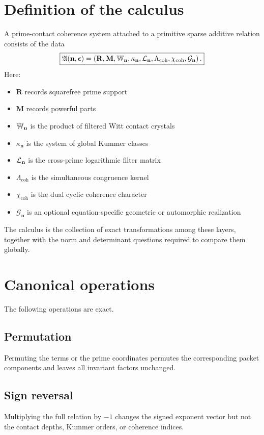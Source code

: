 \section{Definition of the calculus}
A prime-contact coherence system attached to a primitive sparse additive relation consists of the data
\[
\boxed{
\mathfrak A(\mathbf n,\boldsymbol\epsilon)
=
\left(
\mathbf R,
\mathbf M,
\mathbb W_{\mathbf n},
\kappa_{\mathbf n},
\mathcal L_{\mathbf n},
\Lambda_{\mathrm{coh}},
\chi_{\mathrm{coh}},
\mathcal G_{\mathbf n}
\right).
}
\]
Here:
\begin{itemize}[leftmargin=1.5em]
\item $\mathbf R$ records squarefree prime support
\item $\mathbf M$ records powerful parts
\item $\mathbb W_{\mathbf n}$ is the product of filtered Witt contact crystals
\item $\kappa_{\mathbf n}$ is the system of global Kummer classes
\item $\mathcal L_{\mathbf n}$ is the cross-prime logarithmic filter matrix
\item $\Lambda_{\mathrm{coh}}$ is the simultaneous congruence kernel
\item $\chi_{\mathrm{coh}}$ is the dual cyclic coherence character
\item $\mathcal G_{\mathbf n}$ is an optional equation-specific geometric or automorphic realization
\end{itemize}

The calculus is the collection of exact transformations among these layers, together with the norm and determinant questions required to compare them globally.

\section{Canonical operations}
The following operations are exact.

\subsection{Permutation}
Permuting the terms or the prime coordinates permutes the corresponding packet components and leaves all invariant factors unchanged.

\subsection{Sign reversal}
Multiplying the full relation by $-1$ changes the signed exponent vector but not the contact depths, Kummer orders, or coherence indices.

